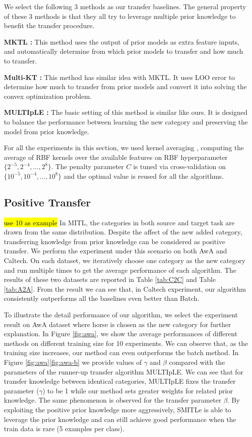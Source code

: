 We select the following 3 methods as our transfer baselines. The general property of these 3 methods is that they all try to leverage multiple prior knowledge to benefit the transfer procedure.

\textbf{MKTL \cite{jie2011multiclass}:} This method uses the output of prior models as extra feature inputs, and automatically determine from which prior models to transfer and how much to transfer.


\textbf{Multi-KT \cite{tommasi2014learning}:} This method has similar idea with MKTL. It uses LOO error to determine how much to transfer from prior models and convert it into solving the convex optimization problem.

\textbf{MULTIpLE \cite{kuzborskij2013n}:} The basic setting of this method is similar like ours. It is designed to balance the performance between learning the new category and preserving the model from prior knowledge.

For all the experiments in this section, we used kernel averaging \cite{gehler2009feature}, computing the average of RBF kernels over the available features on RBF hyperparameter $\{2^{-5},2^{-4},...,2^8\}$. The penalty parameter $C$ is tuned via cross-validation on $\{10^{-5},10^{-4},...,10^8\}$ and the optimal value is reused for all the algorithms.

\subsection{Positive Transfer}
\hl{use 10 as example}
In MITL, the categories in both source and target task are drawn from the same distribution. Despite the affect of the new added category, transferring knowledge from prior knowledge can be considered as positive transfer. We perform the experiment under this scenario on both AwA and Caltech. On each dataset, we iteratively choose one category as the new category and run multiple times to get the average performance of each algorithm. The results of these two datasets are reported in Table \ref{tab:C2C} and Table \ref{tab:A2A}. From the result we can see that, in Caltech experiment, our algorithm consistently outperforms all the baselines even better than Batch.

To illustrate the detail performance of our algorithm, we select the experiment result on AwA dataset where horse is chosen as the new category for further explanation. In Figure \ref{fig:awa}, we show the average performances of different methods on different training size for 10 experiments. We can observe that, as the training size increases, our method can even outperforms the batch method.
In Figure \ref{fig:awa}\ref{fig:awa-b} we provide values of $\gamma$ and $\beta$ compared with the parameters of the runner-up transfer algorithm MULTIpLE. We can see that for transfer knowledge between identical categories, MULTIpLE fixes the transfer parameter ($\gamma$) to be 1 while our method sets greater weights for related prior knowledge. The same phenomenon is observed for the transfer parameter $\beta$. By exploiting the positive prior knowledge more aggressively, SMITLe is able to leverage the prior knowledge and can still achieve good performance when the train data is rare (5 examples per class).
 

